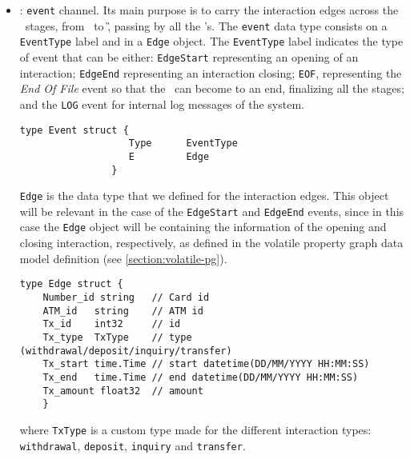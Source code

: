 \begin{itemize}
    \item \eventch: \texttt{event} channel. Its main purpose is to carry the interaction edges across the \DP\ stages, from \Sr\ to \G, passing by all the \F's. The \texttt{event} data type consists on a \texttt{EventType} label and in a \texttt{Edge} object. The \texttt{EventType} label indicates the type of event that can be either: \texttt{EdgeStart} representing an opening of an interaction; \texttt{EdgeEnd} representing an interaction closing; \texttt{EOF}, representing the \textit{End Of File} event so that the \DP\ can become to an end, finalizing all the stages; and the \texttt{LOG} event for internal log messages of the system.
    \begin{center}
    \lstset{style=golangStyle}
    \begin{lstlisting}[caption={\texttt{Event} data type}]
                type Event struct {
            	   Type      EventType
            	   E         Edge
                }
    \end{lstlisting}
    \end{center}

    \texttt{Edge} is the data type that we defined for the interaction edges. This object will be relevant in the case of the \texttt{EdgeStart} and \texttt{EdgeEnd} events, since in this case the \texttt{Edge} object will be containing the information of the opening and closing interaction, respectively, as defined in the volatile property graph data model definition (see \ref{section:volatile-pg}).
    
    \begin{center}
    \lstset{style=golangStyle}
    \begin{lstlisting}[caption={Data type for the interaction edges in Go}]
    type Edge struct {
    Number_id string   // Card id
    ATM_id   string    // ATM id
    Tx_id    int32     // id
    Tx_type  TxType    // type (withdrawal/deposit/inquiry/transfer)
    Tx_start time.Time // start datetime(DD/MM/YYYY HH:MM:SS)
    Tx_end   time.Time // end datetime(DD/MM/YYYY HH:MM:SS)
    Tx_amount float32  // amount
    }
    \end{lstlisting}
    \end{center}

    where \texttt{TxType} is a custom type made for the different interaction types: 
    \texttt{withdrawal}, \texttt{deposit}, \texttt{inquiry} and  \texttt{transfer}. 


\end{itemize}

